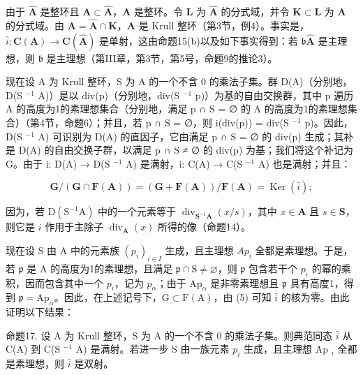 由于 \(\hat{\mathbf{A}}\) 是整环且 \(\mathbf{A} \subset \hat{\mathbf{A}}\)，\(\mathbf{A}\) 是整环。令 \(\mathbf{L}\) 为 \(\hat{\mathbf{A}}\) 的分式域，并令 \(\mathbf{K} \subset \mathbf{L}\) 为 \(\mathbf{A}\) 的分式域。由 \(\mathbf{A} = \hat{\mathbf{A}} \cap \mathbf{K}\)，\(\mathbf{A}\) 是 Krull 整环（第3节，例4）。事实是，\(\bar{i}: \mathbf{C}(\mathbf{A}) \to \mathbf{C}(\hat{\mathbf{A}})\) 是单射，这由命题15(b)以及如下事实得到：若 \(\mathfrak{b}\hat{\mathbf{A}}\) 是主理想，则 \(\mathfrak{b}\) 是主理想（第III章，第3节，第5号，命题9的推论3）。

现在设 A 为 Krull 整环，S 为 A 的一个不含 0 的乘法子集。群 D(A)（分别地，D(S \(^{-1}\) A)）是以 div(p)（分别地，div(S \(^{-1}\) p)）为基的自由交换群，其中 p 遍历 A 的高度为1的素理想集合（分别地，满足 p ∩ S = ∅ 的 A 的高度为1的素理想集合）（第4节，命题6）；并且，若 p ∩ S = ∅，则 i(div(p)) = div(S \(^{-1}\) p)。因此，D(S \(^{-1}\) A) 可识别为 D(A) 的直因子，它由满足 p ∩ S = ∅ 的 div(p) 生成；其补是 D(A) 的自由交换子群，以满足 p ∩ S ≠ ∅ 的 div(p) 为基；我们将这个补记为 G。由于 i: D(A) → D(S \(^{-1}\) A) 是满射，i: C(A) → C(S \(^{-1}\) A) 也是满射；并且：

\[
\mathbf {G} / (\mathbf {G} \cap \mathbf {F} (\mathbf {A})) = (\mathbf {G} + \mathbf {F} (\mathbf {A})) / \mathbf {F} (\mathbf {A}) = \operatorname{Ker} (\bar {i});\tag{5}
\]

因为，若 \(\mathrm{D}(\mathrm{S}^{-1}\mathrm{A})\) 中的一个元素等于 \(\operatorname{div}_{\mathbf{S}^{-1}\mathbf{A}}(x / s)\)，其中 \(x \in \mathbf{A}\) 且 \(s \in \mathbf{S}\)，则它是 \(i\) 作用于主除子 \(\operatorname{div}_{\mathbf{A}}(x)\) 所得的像（命题14）。

现在设 S 由 A 中的元素族 \((p_{i})_{i\in I}\) 生成，且主理想 \(Ap_{i}\) 全都是素理想。于是，若 \(\mathfrak{p}\) 是 A 的高度为1的素理想，且满足 \(\mathfrak{p} \cap \mathrm{S} \neq \varnothing\)，则 \(\mathfrak{p}\) 包含若干个 \(p_{i}\) 的幂的乘积，因而包含其中一个 \(p_{i}\)，记为 \(p_{\alpha}\)；由于 \(\mathrm{Ap}_{\alpha}\) 是非零素理想且 \(\mathfrak{p}\) 具有高度1，得到 \(\mathfrak{p} = \mathrm{Ap}_{\alpha}\)。因此，在上述记号下，\(\mathrm{G} \subset \mathrm{F}(\mathrm{A})\)，由 (5) 可知 \(\bar{i}\) 的核为零。由此证明以下结果：

命题17. 设 A 为 Krull 整环，S 为 A 的一个不含 0 的乘法子集。则典范同态 \(\bar{i}\) 从 C(A) 到 C(S \(^{-1}\) A) 是满射。若进一步 S 由一族元素 \(p_{i}\) 生成，且主理想 Ap \(_{i}\) 全都是素理想，则 \(\bar{i}\) 是双射。

